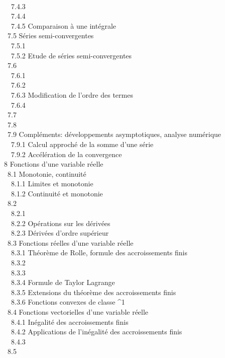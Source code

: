 \documentclass[]{article}
\begin{document}
\\ ~~7.4.3  \\
~~7.4.4 
\\ ~~7.4.5 {Comparaison à une
intégrale} \\ ~7.5 {Séries
semi-convergentes} \\ ~~7.5.1
 \\ ~~7.5.2
{Etude de séries
semi-convergentes} \\ ~7.6
 \\
~~7.6.1 
\\ ~~7.6.2 
\\ ~~7.6.3 {Modification de
l'ordre des termes} \\ ~~7.6.4
 \\ ~7.7
 \\ ~7.8
 \\ ~7.9
{Compléments: développements
asymptotiques, analyse numérique} \\ ~~7.9.1
{Calcul approché de la somme d'une
série} \\ ~~7.9.2 {Accélération de
la convergence} \\ 8 {Fonctions d'une
variable réelle} \\ ~8.1 {Monotonie,
continuité} \\ ~~8.1.1 {Limites et
monotonie} \\ ~~8.1.2 {Continuité
et monotonie} \\ ~8.2  \\
~~8.2.1  \\
~~8.2.2 {Opérations sur les
dérivées} \\ ~~8.2.3 {Dérivées
d'ordre supérieur} \\ ~8.3
{Fonctions réelles d'une variable
réelle} \\ ~~8.3.1 {Théorème de
Rolle, formule des accroissements finis} \\ ~~8.3.2
 \\
~~8.3.3  \\
~~8.3.4 {Formule de Taylor
Lagrange} \\ ~~8.3.5 {Extensions
du théorème des accroissements finis} \\ ~~8.3.6
{Fonctions convexes de classe
^1} \\ ~8.4 {Fonctions
vectorielles d'une variable réelle} \\ ~~8.4.1
{Inégalité des accroissements
finis} \\ ~~8.4.2 {Applications de
l'inégalité des accroissements finis} \\ ~~8.4.3
 \\ ~8.5
\end{document}
